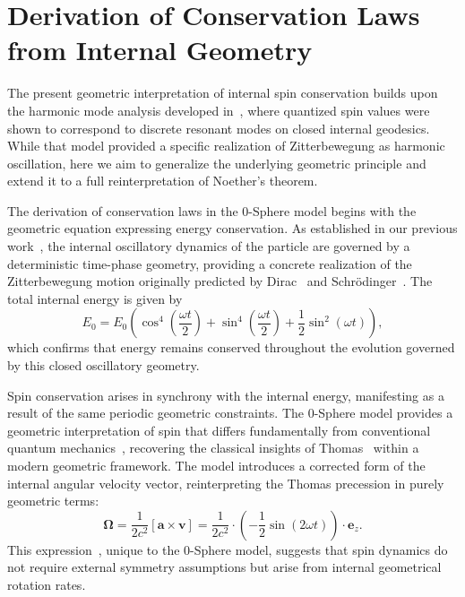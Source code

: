 \documentclass[%
 reprint,
 amsmath,amssymb,
 aps,
]{revtex4-1}
\numberwithin{equation}{section}%
\begin{document}
\section{Derivation of Conservation Laws from Internal Geometry}
\label{sec:geometry}

The present geometric interpretation of internal spin conservation builds upon the harmonic mode analysis developed in~\cite{hanamura2507.0128}, where quantized spin values were shown to correspond to discrete resonant modes on closed internal geodesics. While that model provided a specific realization of Zitterbewegung as harmonic oscillation, here we aim to generalize the underlying geometric principle and extend it to a full reinterpretation of Noether’s theorem.

The derivation of conservation laws in the 0-Sphere model begins with the geometric equation expressing energy conservation. As established in our previous work~\cite{hanamura2309.0047}, the internal oscillatory dynamics of the particle are governed by a deterministic time-phase geometry, providing a concrete realization of the Zitterbewegung motion originally predicted by Dirac~\cite{dirac1928} and Schrödinger~\cite{schrodinger1930}. The total internal energy is given by
\begin{equation}
\boxed{E_0 = E_0 \left( \cos^4 \left( \frac{\omega t}{2} \right) + \sin^4 \left( \frac{\omega t}{2} \right) + \frac{1}{2} \sin^2 (\omega t) \right)},
\label{eq:energy_conservation}
\end{equation}
which confirms that energy remains conserved throughout the evolution governed by this closed oscillatory geometry.


Spin conservation arises in synchrony with the internal energy, manifesting as a result of the same periodic geometric constraints. The 0-Sphere model provides a geometric interpretation of spin that differs fundamentally from conventional quantum mechanics~\cite{pauli1927,uhlenbeck1925}, recovering the classical insights of Thomas~\cite{thomas1926,thomas1927} within a modern geometric framework. The model introduces a corrected form of the internal angular velocity vector, reinterpreting the Thomas precession in purely geometric terms\cite{thomas1926, thomas1927}:
\begin{equation}
\boxed{\boldsymbol{\Omega} = \frac{1}{2c^2}[\boldsymbol{a} \times \boldsymbol{v}] = \frac{1}{2c^2} \cdot \left(-\frac{1}{2}\sin(2\omega t)\right)\cdot \boldsymbol{e}_z}.
\label{eq:angular_velocity_corrected}
\end{equation}
This expression~\cite{hanamura2309.0047}, unique to the 0-Sphere model, suggests that spin dynamics do not require external symmetry assumptions but arise from internal geometrical rotation rates.
\end{document}
